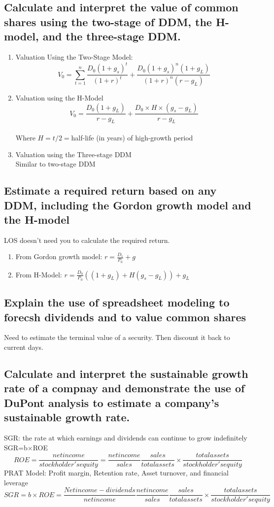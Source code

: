\documentclass{article}
\newcommand{\be}{\begin{enumerate}}
\newcommand{\ee}{\end{enumerate}}
\begin{document}
\subsection{Calculate and interpret the value of common shares using the two-stage of DDM, 
the H-model, and the three-stage DDM.}
\be
    \item Valuation Using the Two-Stage Model: 
        $$
        V_0=\sum_{t=1}^n\frac{D_0(1+g_s)^t}{(1+r)^t}+ \frac{D_0(1+g_s)^n(1+g_L)}{(1+r)^n(r-g_L)}
        $$
    \item Valuation using the H-Model
        $$
        V_0=\frac{D_0(1+g_L)}{r-g_L}+\frac{D_0\times H\times(g_s-g_L)}{r-g_L}
        $$
        \\Where $H=t/2=$half-life (in years) of high-growth period
    \item Valuation using the Three-stage DDM
        \\Similar to two-stage DDM
\ee
\subsection{Estimate a required return based on any DDM, including the Gordon growth model and the H-model}
LOS doesn't need you to calculate the required return.
\be
    \item From Gordon growth model: $r=\frac{D_1}{P_0}+g$
    \item From H-Model: $r=\frac{D_0}{P_0}((1+g_L)+H(g_s-g_L))+g_L$
\ee
\subsection{Explain the use of spreadsheet modeling to forecsh dividends
and to value common shares}
Need to estimate the terminal value of a security. Then discount it back to current days.
\subsection{Calculate and interpret the sustainable growth rate of a compnay and demonstrate the
use of DuPont analysis to estimate a company's sustainable growth rate.}
SGR: the rate at which earnings and dividends can continue to grow indefinitely
\\SGR=b$\times$ROE
$$
    ROE=\frac{net income}{stockholder's equity}=\frac{net income}{sales}
    \frac{sales}{total assets}\times\frac{total assets}{stockholder's equity}
$$
PRAT Model: Profit margin, Retention rate, Asset turnover, and financial leverage
$$
    SGR=b\times ROE=\frac{Net income-dividends}{net income}\frac{net income}{sales}
    \frac{sales}{total assets}\times\frac{total assets}{stockholder's equity}
$$
\end{document}
